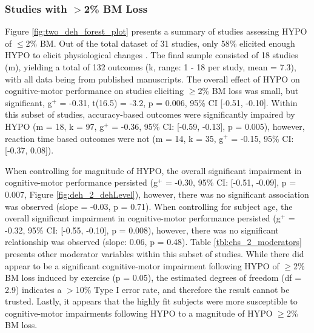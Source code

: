 \subsubsection{Studies with ${>}$2\% BM Loss}
Figure \ref{fig:two_deh_forest_plot} presents a summary of studies assessing HYPO of ${\leq}$2\% BM. Out of the total dataset of 31 studies, only 58\% elicited enough HYPO to elicit physiological changes \cite{cheuvront_dehydration:_2014}. The final sample consisted of 18 studies (m), yielding a total of 132 outcomes (k, range: 1 - 18 per study, mean = 7.3), with all data being from published manuscripts. The overall effect of HYPO on cognitive-motor performance on studies eliciting ${\geq}$2\% BM loss was small, but significant, g${^+}$ =  -0.31, t(16.5) = -3.2, p = 0.006, 95\% CI [-0.51, -0.10]. Within this subset of studies, accuracy-based outcomes were significantly impaired by HYPO (m = 18, k = 97, g${^+}$ = -0.36, 95\% CI: [-0.59, -0.13], p = 0.005), however, reaction time based outcomes were not (m = 14, k = 35, g${^+}$ = -0.15, 95\% CI:[-0.37, 0.08]).

When controlling for magnitude of HYPO, the overall significant impairment in cognitive-motor performance persisted (g${^+}$ = -0.30, 95\% CI: [-0.51, -0.09], p = 0.007, Figure \ref{fig:deh_2_dehLevel}), however, there was no significant association was observed (slope = -0.03, p = 0.71). When controlling for subject age, the overall significant impairment in cognitive-motor performance persisted (g${^+}$ = -0.32, 95\% CI: [-0.55, -0.10], p = 0.008), however, there was no significant relationship was observed (slope: 0.06, p = 0.48). Table \ref{tbl:ehs_2_moderators} presents other moderator variables within this subset of studies. While there did appear to be a significant cognitive-motor impairment following HYPO of ${\geq}$2\% BM loss induced by exercise (p = 0.05), the estimated degrees of freedom (df = 2.9) indicates a ${>}$10\% Type I error rate, and therefore the result cannot be trusted. Lastly, it appears that the highly fit subjects were more susceptible to cognitive-motor impairments following HYPO to a magnitude of HYPO ${\ge}$2\% BM loss.   

